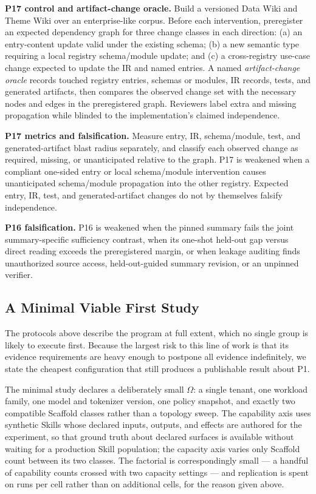 \textbf{P17 control and artifact-change oracle.} Build a versioned Data Wiki and Theme Wiki over an enterprise-like corpus. Before each intervention, preregister an expected dependency graph for three change classes in each direction: (a) an entry-content update valid under the existing schema; (b) a new semantic type requiring a local registry schema/module update; and (c) a cross-registry use-case change expected to update the IR and named entries. A named \textit{artifact-change oracle} records touched registry entries, schemas or modules, IR records, tests, and generated artifacts, then compares the observed change set with the necessary nodes and edges in the preregistered graph. Reviewers label extra and missing propagation while blinded to the implementation's claimed independence.

\textbf{P17 metrics and falsification.} Measure entry, IR, schema/module, test, and generated-artifact blast radius separately, and classify each observed change as required, missing, or unanticipated relative to the graph. P17 is weakened when a compliant one-sided entry or local schema/module intervention causes unanticipated schema/module propagation into the other registry. Expected entry, IR, test, and generated-artifact changes do not by themselves falsify independence.

\textbf{P16 falsification.} P16 is weakened when the pinned summary fails the joint summary-specific sufficiency contrast, when its one-shot held-out gap versus direct reading exceeds the preregistered margin, or when leakage auditing finds unauthorized source access, held-out-guided summary revision, or an unpinned verifier.

\subsection{A Minimal Viable First Study}
\label{sec:eval-minimal}

The protocols above describe the program at full extent, which no single group is likely to execute first. Because the largest risk to this line of work is that its evidence requirements are heavy enough to postpone all evidence indefinitely, we state the cheapest configuration that still produces a publishable result about P1.

The minimal study declares a deliberately small $\Omega$: a single tenant, one workload family, one model and tokenizer version, one policy snapshot, and exactly two compatible Scaffold classes rather than a topology sweep. The capability axis uses synthetic Skills whose declared inputs, outputs, and effects are authored for the experiment, so that ground truth about declared surfaces is available without waiting for a production Skill population; the capacity axis varies only Scaffold count between its two classes. The factorial is correspondingly small --- a handful of capability counts crossed with two capacity settings --- and replication is spent on runs per cell rather than on additional cells, for the reason given above.

